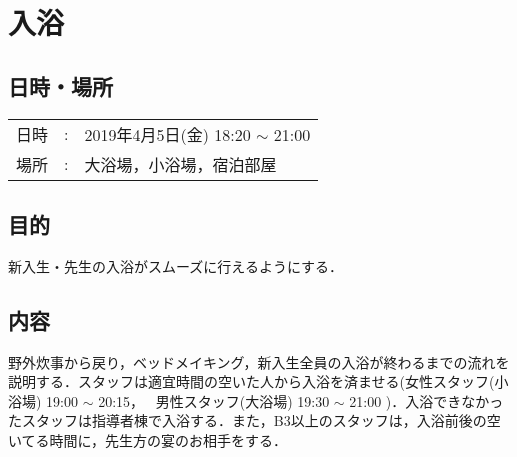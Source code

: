 %
\section{入浴}


\subsection{日時・場所}
\begin{tabular}{p{}rp{}}
  日時 & : & 2019年4月5日(金) 18:20 $\sim$ 21:00\\
  場所 & : & 大浴場，小浴場，宿泊部屋
\end{tabular}


\subsection{目的}
新入生・先生の入浴がスムーズに行えるようにする．

\subsection{内容}
野外炊事から戻り，ベッドメイキング，新入生全員の入浴が終わるまでの流れを説明する．スタッフは適宜時間の空いた人から入浴を済ませる(女性スタッフ(小浴場) 19:00  $\sim$ 20:15，
\ 男性スタッフ(大浴場) 19:30 $\sim$ 21:00
)．入浴できなかったスタッフは指導者棟で入浴する．また，B3以上のスタッフは，入浴前後の空いてる時間に，先生方の宴のお相手をする．


